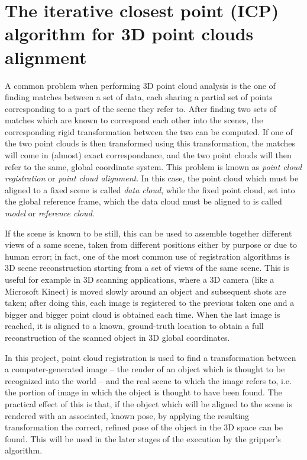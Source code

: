 \section{The iterative closest point (ICP) algorithm for 3D point clouds
alignment}

A common problem when performing 3D point cloud analysis is the one of finding
matches between a set of data, each sharing a partial set of points
corresponding to a part of the scene they refer to. After finding two sets of
matches which are known to correspond each other into the scenes, the
corresponding rigid transformation between the two can be computed. If one of the two
point clouds is then transformed using this transformation, the matches will
come in (almost) exact correspondance, and the two point clouds will then refer
to the same, global coordinate system. This problem is known as
\emph{point cloud registration} or \emph{point cloud alignment}. In this case,
the point cloud which must be aligned to a fixed scene is called \emph{data
cloud}, while the fixed point cloud, set into the global reference frame, 
which the data cloud must be aligned to is called \emph{model} or
\emph{reference cloud}.

If the scene is known to be still, this can be used to assemble together
different views of a same scene,
taken from different positions either by purpose or due to human error; in
fact, one of the most common use of registration algorithms is 3D scene
reconstruction starting from a set of views of the same scene. This is useful
for example in 3D scanning applications, where a 3D camera (like a Microsoft
Kinect) is moved slowly around an object and subsequent shots are taken;
after doing this, each image is registered to the previous taken one and a
bigger and bigger point cloud is obtained each time. When the last image is
reached, it is aligned to a known, ground-truth location to obtain a full
reconstruction of the scanned object in 3D global coordinates.

In this project, point cloud registration is used to find a transformation
between a computer-generated image -- the render of an object which is thought
to be recognized into the world -- and the real scene to which the image refers
to, i.e. the portion of image in which the object is thought to have been
found. The practical effect of this is that, if the object which will be
aligned to the scene is rendered with an associated, known pose, by applying
the resulting transformation the correct, refined pose of the object in the 3D
space can be found. This will be used in the later stages of the execution by
the gripper's algorithm.

